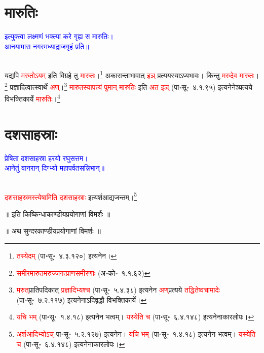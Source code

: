 \section[मारुतिः]{मारुतिः}
\centering\textcolor{blue}{इत्युक्त्वा लक्ष्मणं भक्त्या करे गृह्य स मारुतिः।\nopagebreak\\
आनयामास नगरमध्याद्राजगृहं प्रति॥}\nopagebreak\\
\\
\begin{sloppypar}\justifying\noindent\hspace{10mm} यद्यपि \textcolor{red}{मरुतोऽयम्} इति विग्रहे तु \textcolor{red}{मारुतः}।\footnote{\textcolor{red}{तस्येदम्} (पा॰सू॰~४.३.१२०) इत्यनेन।} अकारान्ताभावात् \textcolor{red}{इञ्} प्रत्ययस्याऽप्यभावः। किन्तु \textcolor{red}{मरुदेव मारुतः}।\footnote{\textcolor{red}{समीरमारुतमरुज्जगत्प्राणसमीरणाः} (अ॰को॰~१.१.६२)} प्रज्ञादित्वात्स्वार्थे \textcolor{red}{अण्}।\footnote{\textcolor{red}{मरुत्‌}\-प्रातिपदिकात् \textcolor{red}{प्रज्ञादिभ्यश्च} (पा॰सू॰~५.४.३८) इत्यनेन \textcolor{red}{अण्‌}\-प्रत्यये \textcolor{red}{तद्धितेष्वचामादेः} (पा॰सू॰~७.२.११७) इत्यनेनाऽदिवृद्धौ विभक्तिकार्ये।} \textcolor{red}{मारुतस्यापत्यं पुमान् मारुतिः} इति \textcolor{red}{अत इञ्} (पा॰सू॰~४.१.९५) इत्यनेनेञ्प्रत्यये विभक्ति\-कार्ये \textcolor{red}{मारुतिः}।\footnote{\textcolor{red}{यचि भम्} (पा॰सू॰~१.४.१८) इत्यनेन भत्वम्। \textcolor{red}{यस्येति च} (पा॰सू॰~६.४.१४८) इत्यनेनाकार\-लोपः।}\end{sloppypar}
\section[दशसाहस्राः]{दशसाहस्राः}
\centering\textcolor{blue}{प्रेषिता दशसाहस्रा हरयो रघुसत्तम।\nopagebreak\\
आनेतुं वानरान् दिग्भ्यो महापर्वतसन्निभान्॥}\nopagebreak\\
\\
\begin{sloppypar}\justifying\noindent\hspace{10mm} \textcolor{red}{दशसाहस्रमस्त्येषामिति दशसाहस्राः} इत्यर्शआद्यजन्तम्।\footnote{\textcolor{red}{अर्शआदिभ्योऽच्} पा॰सू॰~५.२.१२७) इत्यनेन। \textcolor{red}{यचि भम्} (पा॰सू॰~१.४.१८) इत्यनेन भत्वम्। \textcolor{red}{यस्येति च} (पा॰सू॰~६.४.१४८) इत्यनेनाकार\-लोपः।}\end{sloppypar}
\vspace{2mm}
\centering ॥ इति किष्किन्धाकाण्डीयप्रयोगाणां विमर्शः ॥\nopagebreak\\
\vspace{4mm}
{}
\centering ॥ अथ सुन्दरकाण्डीयप्रयोगाणां विमर्शः ॥\nopagebreak\\
